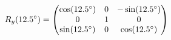 \documentclass[preview]{standalone}
\begin{document}
\begin{align*}
\special{dvisvgm:raw <g id='unique000'>}R_y(12.5^\circ) = \begin{pmatrix} \cos(12.5^\circ) & 0 & -\sin(12.5^\circ) \\ 0 & 1 & 0 \\ \sin(12.5^\circ) & 0 & \cos(12.5^\circ) \end{pmatrix}\special{dvisvgm:raw </g>}
\end{align*}
\end{document}
